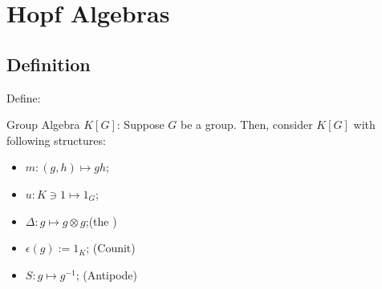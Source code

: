 \documentclass[Total.tex]{subfiles}
\begin{document}
	\chapter{Hopf Algebras}
		\section{Definition}
			\begin{Def}
				Define:
			\end{Def}
			
			\begin{example}
				Group Algebra $K[G]$: Suppose $G$ be a group. Then, consider $K[G]$ with following structures:
				\begin{itemize}
					\item $m:(g,h)\mapsto gh$; 
					\item $u:K\ni 1\mapsto 1_G$;
					\item $\Delta:g\mapsto g\otimes g$;(the )
					\item $\epsilon(g):=1_K$; (Counit)
					\item $S:g\mapsto g^{-1}$; (Antipode)
				\end{itemize}
			\end{example}
\end{document}
